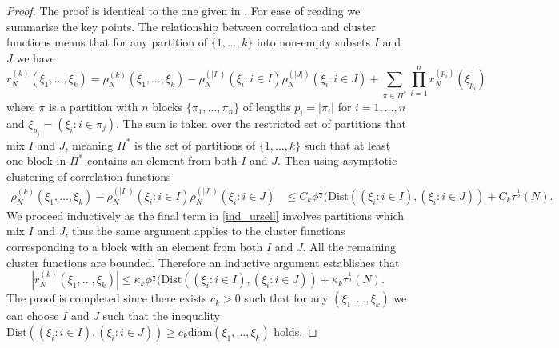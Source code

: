 \documentclass[11pt,reqno]{amsproc}
\numberwithin{equation}{section}
\numberwithin{theorem}{section}
\begin{document}
\begin{proof}
The proof is identical to the one given in \cite[Proof of Claim 4.1]{NS12}. For ease of reading we summarise the key points. The relationship between correlation and cluster functions means that for any 
partition of $\{1, \ldots, k\}$ into non-empty subsets $I$ and $J$ we have 
\begin{equation}
\label{ind_ursell}
r_N^{(k)}(\xi_1, \ldots, \xi_k) = \rho_N^{(k)}(\xi_1, \ldots, \xi_k) - \rho_N^{(\lvert I \rvert)}(\xi_i : i \in I) \rho_N^{(\lvert J \rvert)}(\xi_i : i \in J) + \sum_{\pi \in \Pi^*} \prod_{i=1}^{n} r_N^{(p_i)}(\xi_{p_i})
\end{equation}
where $\pi$ is a partition with $n$ blocks $\{\pi_1, \ldots, \pi_n\}$ of lengths $p_i = \lvert \pi_i \rvert$ for $i =1, \ldots, n$ and $\xi_{p_j} = (\xi_i : i \in \pi_j).$ The sum is taken over the restricted set of partitions that mix $I$ and $J$, meaning $\Pi^*$ is the set of partitions of $\{1, \ldots, k\}$ such that at least one block in $\Pi^*$ contains an element from both $I$ and $J$. 
Then using asymptotic clustering of correlation functions 
\begin{align*}
 \rho_N^{(k)}(\xi_1, \ldots, \xi_k) - \rho_N^{(\lvert I \rvert)}(\xi_i : i \in I) \rho_N^{(\lvert J \rvert)}(\xi_i : i \in J)
 & \leq  C_k \phi^{\frac{1}{2}}(\mathrm{Dist}((\xi_i : i \in I), (\xi_i : i \in J))+ C_k \tau^{\frac{1}{2}}(N). 
\end{align*}
We proceed inductively as the final term in \eqref{ind_ursell} involves partitions which mix $I$ and $J$, thus the same argument applies to the cluster functions corresponding to a block with an element from both $I$ and $J$. All the remaining cluster functions are bounded. Therefore an inductive argument establishes that
\begin{equation}
|r^{(k)}_{N}(\xi_1,\ldots,\xi_{k})| \leq \kappa_k \phi^{\frac{1}{2}}(\mathrm{Dist}((\xi_i : i \in I), (\xi_i : i \in J))+ \kappa_k \tau^{\frac{1}{2}}(N).
\end{equation}
The proof is completed since there exists $c_k > 0$ such that for any $(\xi_1, \ldots, \xi_k)$ we can choose $I$ and $J$ such that the inequality $\mathrm{Dist}((\xi_i : i \in I), (\xi_i : i \in J)) \geq c_k \mathrm{diam}(\xi_1,\ldots,\xi_k)$ holds. 
\end{proof}
\end{document}
